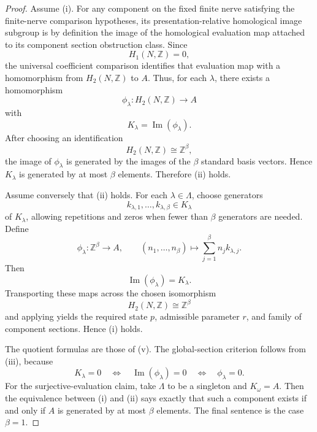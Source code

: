 \begin{proof}
Assume \textup{(i)}. For any component on the fixed finite nerve satisfying the
finite-nerve comparison hypotheses, its presentation-relative homological image subgroup is by
definition the image of the homological evaluation map attached to its component section
obstruction class. Since
\[
H_1(N,\mathbb Z)=0,
\]
the universal coefficient comparison identifies that evaluation map with a
homomorphism from $H_2(N,\mathbb Z)$ to $A$. Thus, for each $\lambda$, there
exists a homomorphism
\[
\phi_\lambda:H_2(N,\mathbb Z)\to A
\]
with
\[
K_\lambda=\operatorname{Im}(\phi_\lambda).
\]
After choosing an identification
\[
H_2(N,\mathbb Z)\cong \mathbb Z^\beta,
\]
the image of $\phi_\lambda$ is generated by the images of the $\beta$ standard basis vectors. Hence $K_\lambda$ is generated by at most $\beta$ elements. Therefore \textup{(ii)} holds.

Assume conversely that \textup{(ii)} holds. For each $\lambda\in\Lambda$, choose generators
\[
k_{\lambda,1},\dots,k_{\lambda,\beta}\in K_\lambda
\]
of $K_\lambda$, allowing repetitions and zeros when fewer than $\beta$ generators are needed. Define
\[
\phi_\lambda:\mathbb Z^\beta\to A,
\qquad
(n_1,\dots,n_\beta)\longmapsto \sum_{j=1}^{\beta} n_j k_{\lambda,j}.
\]
Then
\[
\operatorname{Im}(\phi_\lambda)=K_\lambda.
\]
Transporting these maps across the chosen isomorphism
\[
H_2(N,\mathbb Z)\cong \mathbb Z^\beta
\]
and applying  yields the required state $p$, admissible parameter $r$, and family of component sections. Hence \textup{(i)} holds.

The quotient formulas are those of (v). The global-section criterion follows from (iii), because
\[
K_\lambda=0
\quad\Longleftrightarrow\quad
\operatorname{Im}(\phi_\lambda)=0
\quad\Longleftrightarrow\quad
\phi_\lambda=0.
\]
For the surjective-evaluation claim, take $\Lambda$ to be a singleton and $K_\omega=A$. Then the equivalence between \textup{(i)} and \textup{(ii)} says exactly that such a component exists if and only if $A$ is generated by at most $\beta$ elements. The final sentence is the case $\beta=1$.
\end{proof}
